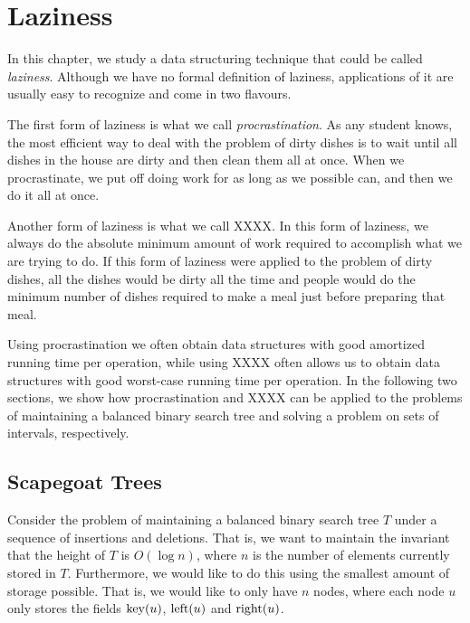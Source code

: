 \chapter{Laziness}

 
In this chapter, we study a data structuring technique that could be
called \emph{laziness}.  Although we have no formal definition of
laziness, applications of it are usually easy to recognize and come
in two flavours.

The first form of laziness is what we call \emph{procrastination}.  As
any student knows, the most efficient way to deal with the problem of
dirty dishes is to wait until all dishes in the house are dirty and
then clean them all at once.  When we procrastinate, we put off doing
work for as long as we possible can, and then we do it all at once.

Another form of laziness is what we call XXXX. In this form of
laziness, we always do the absolute minimum amount of work required to
accomplish what we are trying to do.  If this form of laziness were
applied to the problem of dirty dishes, all the dishes would be dirty
all the time and people would do the minimum number of dishes required
to make a meal just before preparing that meal.

Using procrastination we often obtain data structures with good
amortized running time per operation, while using XXXX often allows us
to obtain data structures with good worst-case running time per
operation.  In the following two sections, we show how procrastination
and XXXX can be applied to the problems of maintaining a balanced
binary search tree and solving a problem on sets of intervals,
respectively.

\section{Scapegoat Trees}

Consider the problem of maintaining a balanced binary search tree $T$
under a sequence of insertions and deletions.  That is, we want to
maintain the invariant that the height of $T$ is $O(\log n)$, where
$n$ is the number of elements currently stored in $T$.  Furthermore,
we would like to do this using the smallest amount of storage
possible.  That is, we would like to only have $n$ nodes, where each
node $u$ only stores the fields $\mathrm{key}(u)$, $\mathrm{left}(u)$ and $\mathrm{right}(u)$.

